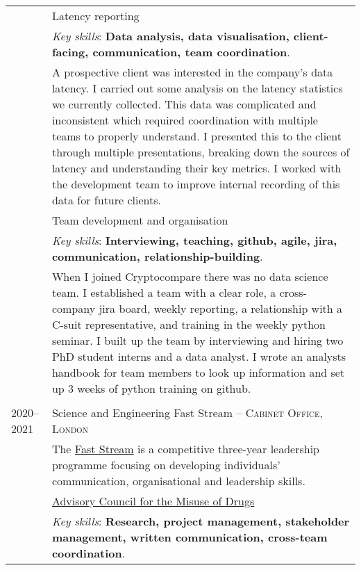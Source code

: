 \documentclass[a4paper,10pt]{article}
\newcommand{\tab}{\hspace{10 pt}}
\begin{document}
\begin{tabular}{p{2.25cm}|p{15cm}}
	 & \tab Latency reporting\\
	 & \footnotesize{\emph{Key skills}: \textbf{Data analysis, data visualisation, client-facing, communication, team coordination}.}\\
	 & \footnotesize{A prospective client was interested in the company's data latency. I carried out some analysis on the latency statistics we currently collected. This data was complicated and inconsistent which required coordination with multiple teams to properly understand. I presented this to the client through multiple presentations, breaking down the sources of latency and understanding their key metrics. I worked with the development team to improve internal recording of this data for future clients.} \vspace{0.05 in}\\
	 & \tab Team development and organisation\\
	 & \footnotesize{\emph{Key skills}: \textbf{Interviewing, teaching, github, agile, jira, communication, relationship-building}.}\\
	 & \footnotesize{When I joined Cryptocompare there was no data science team. I established a team with a clear role, a cross-company jira board, weekly reporting, a relationship with a C-suit representative, and training in the weekly python seminar. I built up the team by interviewing and hiring two PhD student interns and a data analyst. I wrote an analysts handbook for team members to look up information and set up 3 weeks of python training on github.} \vspace{0.05 in}\\		 
	 \multicolumn{2}{c}{} \\
%
%	 	 
	\textsc{2020--2021} & Science and Engineering Fast Stream -- \textsc{Cabinet Office, London}\\&\footnotesize{The \href{https://www.faststream.gov.uk/}{Fast Stream} is a competitive three-year leadership programme focusing on developing individuals' communication, organisational and leadership skills.}\\ 
	 & \tab \href{https://www.gov.uk/government/organisations/advisory-council-on-the-misuse-of-drugs}{Advisory Council for the Misuse of Drugs}\\
	 & \footnotesize{\emph{Key skills}: \textbf{Research, project management, stakeholder management, written communication, cross-team coordination}.}\\

\end{tabular}
\end{document}

